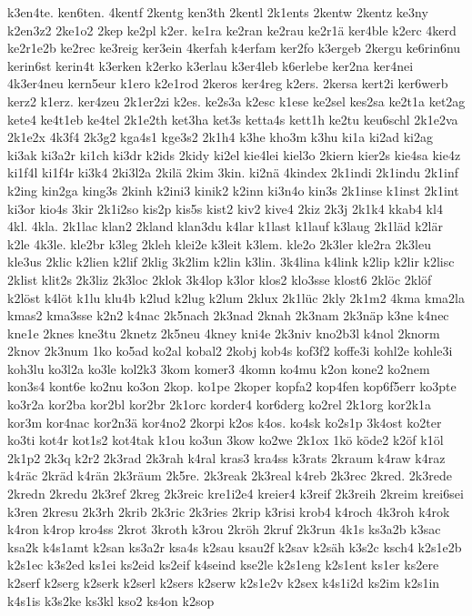 {k3en4te.
ken6ten.
4kentf
2kentg
ken3th
2kentl
2k1ents
2kentw
2kentz
ke3ny
k2en3z2
2ke1o2
2kep
ke2pl
k2er.
ke1ra
ke2ran
ke2rau
ke2r1ä
ker4ble
k2erc
4kerd
ke2r1e2b
ke2rec
ke3reig
ker3ein
4kerfah
k4erfam
ker2fo
k3ergeb
2kergu
ke6rin6nu
kerin6st
kerin4t
k3erken
k2erko
k3erlau
k3er4leb
k6erlebe
ker2na
ker4nei
4k3er4neu
kern5eur
k1ero
k2e1rod
2keros
ker4reg
k2ers.
2kersa
kert2i
ker6werb
kerz2
k1erz.
ker4zeu
2k1er2zi
k2es.
ke2s3a
k2esc
k1ese
ke2sel
kes2sa
ke2t1a
ket2ag
kete4
ke4t1eb
ke4tel
2k1e2th
ket3ha
ket3s
ketta4s
kett1h
ke2tu
keu6schl
2k1e2va
2k1e2x
4k3f4
2k3g2
kga4s1
kge3s2
2k1h4
k3he
kho3m
k3hu
ki1a
ki2ad
ki2ag
ki3ak
ki3a2r
ki1ch
ki3dr
k2ids
2kidy
ki2el
kie4lei
kiel3o
2kiern
kier2s
kie4sa
kie4z
ki1f4l
ki1f4r
ki3k4
2ki3l2a
2kilä
2kim
3kin.
ki2nä
4kindex
2k1indi
2k1indu
2k1inf
k2ing
kin2ga
king3s
2kinh
k2ini3
kinik2
k2inn
ki3n4o
kin3s
2k1inse
k1inst
2k1int
ki3or
kio4s
3kir
2k1i2so
kis2p
kis5s
kist2
kiv2
kive4
2kiz
2k3j
2k1k4
kkab4
kl4
4kl.
4kla.
2k1lac
klan2
2kland
klan3du
k4lar
k1last
k1lauf
k3laug
2k1läd
k2lär
k2le
4k3le.
kle2br
k3leg
2kleh
klei2e
k3leit
k3lem.
kle2o
2k3ler
kle2ra
2k3leu
kle3us
2klic
k2lien
k2lif
2klig
3k2lim
k2lin
k3lin.
3k4lina
k4link
k2lip
k2lir
k2lisc
2klist
klit2s
2k3liz
2k3loc
2klok
3k4lop
k3lor
klos2
klo3sse
klost6
2klöc
2klöf
k2löst
k4löt
k1lu
klu4b
k2lud
k2lug
k2lum
2klux
2k1lüc
2kly
2k1m2
4kma
kma2la
kmas2
kma3sse
k2n2
k4nac
2k5nach
2k3nad
2knah
2k3nam
2k3näp
k3ne
k4nec
kne1e
2knes
kne3tu
2knetz
2k5neu
4kney
kni4e
2k3niv
kno2b3l
k4nol
2knorm
2knov
2k3num
1ko
ko5ad
ko2al
kobal2
2kobj
kob4s
kof3f2
koffe3i
kohl2e
kohle3i
koh3lu
ko3l2a
ko3le
kol2k3
3kom
komer3
4komn
ko4mu
k2on
kone2
ko2nem
kon3s4
kont6e
ko2nu
ko3on
2kop.
ko1pe
2koper
kopfa2
kop4fen
kop6f5err
ko3pte
ko3r2a
kor2ba
kor2bl
kor2br
2k1orc
korder4
kor6derg
ko2rel
2k1org
kor2k1a
kor3m
kor4nac
kor2n3ä
kor4no2
2korpi
k2os
k4os.
ko4sk
ko2s1p
3k4ost
ko2ter
ko3ti
kot4r
kot1s2
kot4tak
k1ou
ko3un
3kow
ko2we
2k1ox
1kö
köde2
k2öf
k1öl
2k1p2
2k3q
k2r2
2k3rad
2k3rah
k4ral
kras3
kra4ss
k3rats
2kraum
k4raw
k4raz
k4räc
2kräd
k4rän
2k3räum
2k5re.
2k3reak
2k3real
k4reb
2k3rec
2kred.
2k3rede
2kredn
2kredu
2k3ref
2kreg
2k3reic
kre1i2e4
kreier4
k3reif
2k3reih
2kreim
krei6sei
k3ren
2kresu
2k3rh
2krib
2k3ric
2k3ries
2krip
k3risi
krob4
k4roch
4k3roh
k4rok
k4ron
k4rop
kro4ss
2krot
3kroth
k3rou
2kröh
2kruf
2k3run
4k1s
ks3a2b
k3sac
ksa2k
k4s1amt
k2san
ks3a2r
ksa4s
k2sau
ksau2f
k2sav
k2säh
k3s2c
ksch4
k2s1e2b
k2s1ec
k3s2ed
ks1ei
ks2eid
ks2eif
k4seind
kse2le
k2s1eng
k2s1ent
ks1er
ks2ere
k2serf
k2serg
k2serk
k2serl
k2sers
k2serw
k2s1e2v
k2sex
k4s1i2d
ks2im
k2s1in
k4s1is
k3s2ke
ks3kl
kso2
ks4on
k2sop
}
